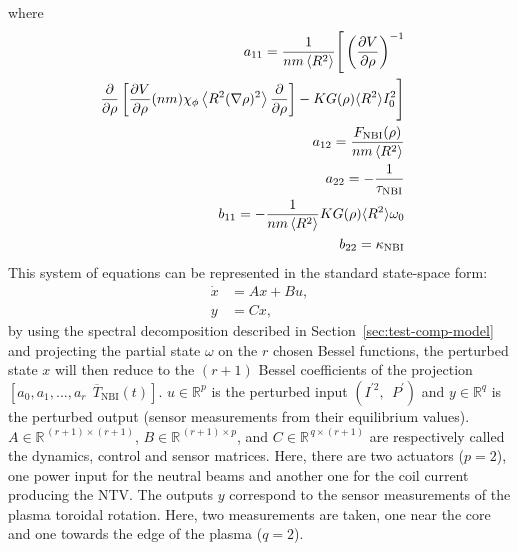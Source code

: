 \documentclass{iopart}
\begin{document}
 where
 \begin{eqnarray}
 a_{11} =  \frac{1}{n m \left<R^2\right>} \Bigg[ \left( \frac{\partial V}{\partial\rho}\right)^{-1} \nonumber \\
   \hspace{-1em}\frac{\partial}{\partial \rho} 
   \left[\frac{\partial V}{\partial \rho}(n m)\chi_\phi 
   \left< R^2 (\nabla \rho)^2\right> 
   \frac{\partial}{\partial\rho}\right]-K G(\rho) \langle R^2 \rangle  I^2_0 \Bigg]  \nonumber \\
 a_{12} =  \frac{ F_\text{NBI}(\rho) }{n m \left<R^2\right>}\nonumber \\
 a_{22} = - \frac{1}{\tau_\text{NBI}}  \nonumber \\  
 b_{11} = - \frac{1}{n m \left<R^2\right>} K G(\rho) \langle R^2 \rangle  \omega_0 \nonumber \\
 b_{22} = \kappa_\text{NBI} \nonumber
 \end{eqnarray}
% 
This system of equations can be represented in the standard state-space form:
\begin{align}
	\dot{x} &= A x + B u, \label{eqn:state-space1} \\
	y &= C x, \label{eqn:state-space2} 
\end{align}
by using the spectral decomposition described in Section~\ref{sec:test-comp-model} and projecting the partial state $ \omega$ on the $r$ chosen Bessel functions, the perturbed state $x$ will then reduce to the $(r+1)$ Bessel coefficients of the projection $ \left[ a_{0}, a_{1}, ..., a_{r}  \ \ \overline{T}_\text{NBI}(t) \right]$.
%
%
$u \in \mathbb{R}^p$ is the perturbed input $\left( I^{'2}, \ \  P^{'} \right)$ and $y \in \mathbb{R}^q$ is the perturbed output (sensor measurements from their equilibrium values).
$A \in \mathbb{R}^{\, (r+1) \times (r+1)}$, $B \in \mathbb{R}^{\,(r+1) \times p}$, and $C \in \mathbb{R}^{\, q \times (r+1)}$ are respectively called the dynamics, control and sensor matrices.
Here, there are two actuators ($p=2$), one power input for the neutral beams and another one for the coil current producing the NTV.
The outputs $y$ correspond to the sensor measurements of the plasma toroidal rotation. Here, two measurements are taken, one near the core and one towards the edge of the plasma ($q=2$).
%
\end{document}
